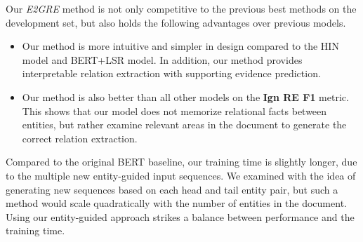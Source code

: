 \documentclass[11pt,a4paper]{article}
\begin{document}
\begin{table}[!h]
\begin{small}
\begin{center}
\end{center}
\end{small}
\caption{\label{font-table} Results of relation extraction on the supervised setting of DocRED. Shown above are comparisons between {\em E2GRE}, and other published models on the validation set with BERT-base as the pretrained language model.}
\label{table:re}
\end{table}

\noindent Our {\em E2GRE} method is not only competitive to the previous best methods on the development set, but also holds the following advantages over previous models.
\begin{itemize}
\item Our method is more intuitive and simpler in design compared to the HIN model and BERT+LSR model. In addition, our method provides interpretable relation extraction with supporting evidence prediction.





\item Our method is also better than all other models on the \textbf{Ign RE F1} metric.
This shows that our model does not memorize relational facts between entities, but rather examine relevant areas in the document to generate the correct relation extraction.
\end{itemize}
Compared to the original BERT baseline, our training time is slightly longer, due to the multiple new entity-guided input sequences. We examined with the idea of generating new sequences based on each head and tail entity pair, but such a method would scale quadratically with the number of entities in the document. Using our entity-guided approach strikes a balance between performance and the training time.
\end{document}
